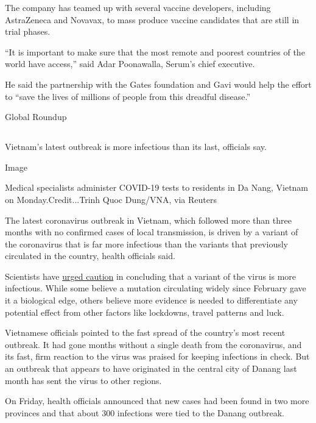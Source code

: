 The company has teamed up with several vaccine developers, including
AstraZeneca and Novavax, to mass produce vaccine candidates that are
still in trial phases.

``It is important to make sure that the most remote and poorest
countries of the world have access,'' said Adar Poonawalla, Serum's
chief executive.

He said the partnership with the Gates foundation and Gavi would help
the effort to ``save the lives of millions of people from this dreadful
disease.''

Global Roundup

\hypertarget{-6}{%
\subsection{}\label{-6}}

Vietnam's latest outbreak is more infectious than its last, officials
say.

Image

Medical specialists administer COVID-19 tests to residents in Da Nang,
Vietnam on Monday.Credit...Trinh Quoc Dung/VNA, via Reuters

The latest coronavirus outbreak in Vietnam, which followed more than
three months with no confirmed cases of local transmission, is driven by
a variant of the coronavirus that is far more infectious than the
variants that previously circulated in the country, health officials
said.

Scientists have
\href{https://www.nytimes3xbfgragh.onion/2020/06/12/science/coronavirus-mutation-genetics-spike.html}{urged
caution} in concluding that a variant of the virus is more infectious.
While some believe a mutation circulating widely since February gave it
a biological edge, others believe more evidence is needed to
differentiate any potential effect from other factors like lockdowns,
travel patterns and luck.

Vietnamese officials pointed to the fast spread of the country's most
recent outbreak. It had gone months without a single death from the
coronavirus, and its fast, firm reaction to the virus was praised for
keeping infections in check. But an outbreak that appears to have
originated in the central city of Danang last month has sent the virus
to other regions.

On Friday, health officials announced that new cases had been found in
two more provinces and that about 300 infections were tied to the Danang
outbreak.


